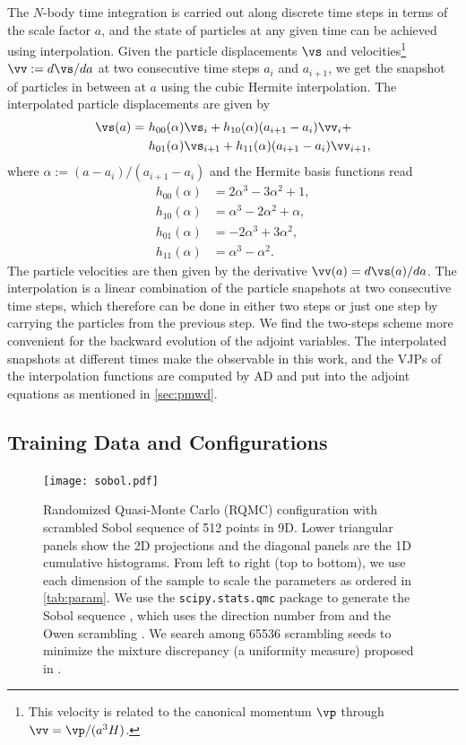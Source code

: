 \documentclass[modern, trackchanges, dvipsnames]{aastex631}
\renewcommand{\d}{d}
\begin{document}
The $N$-body time integration is carried out along discrete time steps
in terms of the scale factor $a$, and the state of particles at any
given time can be achieved using interpolation.
Given the particle displacements $\vs$ and velocities\footnote{This
velocity is related to the canonical momentum $\vp$ through $\vv =
\vp/(a^3H)$.} $\vv := \d\vs/\d a$ at two consecutive time steps $a_i$ and
$a_{i+1}$, we get the snapshot of particles in between at $a$ using the
cubic Hermite interpolation.
The interpolated particle displacements are given by
\begin{align}
  \vs(a) =\ &h_{00}(\alpha)\vs_i + h_{10}(\alpha)(a_{i+1} - a_i)\vv_i + \nonumber\\
           &h_{01}(\alpha)\vs_{i+1} + h_{11}(\alpha)(a_{i+1} - a_i)\vv_{i+1},
\end{align}
where $\alpha := (a - a_i)/(a_{i+1} - a_i)$ and the Hermite basis
functions read
\begin{align}
  h_{00}(\alpha) &= 2\alpha^3 - 3\alpha^2 + 1, \nonumber\\
  h_{10}(\alpha) &= \alpha^3 - 2\alpha^2 + \alpha, \nonumber\\
  h_{01}(\alpha) &= -2\alpha^3 + 3\alpha^2, \nonumber\\
  h_{11}(\alpha) &= \alpha^3 - \alpha^2.
\end{align}
The particle velocities are then given by the derivative $\vv(a) =
\d\vs(a) / \d a$.
The interpolation is a linear combination of the particle snapshots at
two consecutive time steps, which therefore can be done in either two
steps or just one step by carrying the particles from the previous step.
We find the two-steps scheme more convenient for the backward evolution
of the adjoint variables.
The interpolated snapshots at different times make the observable in
this work, and the VJPs of the interpolation functions are computed by
AD and put into the adjoint equations as mentioned in
\autoref{sec:pmwd}.


\vspace{1em}
\subsection{Training Data and Configurations}

\begin{figure}
  \centering
  \texttt{[image: sobol.pdf]}
  \caption{Randomized Quasi-Monte Carlo (RQMC) configuration with
    scrambled Sobol sequence of 512 points in 9D.
    Lower triangular panels show the 2D projections and the diagonal
    panels are the 1D cumulative histograms.
    From left to right (top to bottom), we use each dimension of the
    sample to scale the parameters as ordered in \autoref{tab:param}.
    We use the \texttt{scipy.stats.qmc} package \citep{SciPy} to
    generate the Sobol sequence \citep{Sobol1967}, which uses the
    direction number from \citet{JoeKuo2008} and the Owen scrambling
    \citep{Owen1998}.
    We search among 65536 scrambling seeds to minimize the mixture
    discrepancy (a uniformity measure) proposed in \citet{Zhou2013MD}.
  }
  \label{fig:sobol}
\end{figure}
\end{document}
